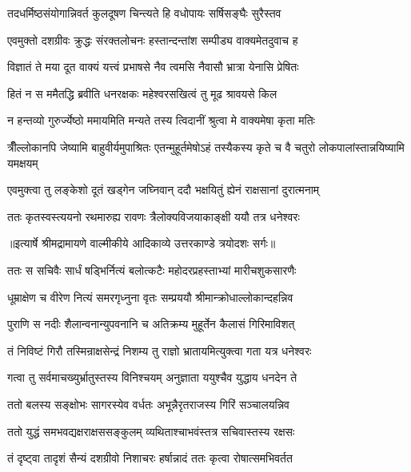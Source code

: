 \twolineshloka
{तदधर्मिष्ठसंयोगान्निवर्त कुलदूषण}
{चिन्त्यते हि वधोपायः सर्षिसङ्घैः सुरैस्तव} %

\twolineshloka
{एवमुक्तो दशग्रीवः क्रुद्धः संरक्तलोचनः}
{हस्तान्दन्तांश सम्पीड्य वाक्यमेतदुवाच ह} %

\twolineshloka
{विज्ञातं ते मया दूत वाक्यं यत्त्वं प्रभाषसे}
{नैव त्वमसि नैवासौ भ्रात्रा येनासि प्रेषितः} %

\twolineshloka
{हितं न स ममैतद्धि ब्रवीति धनरक्षकः}
{महेश्वरसखित्वं तु मूढ श्रावयसे किल} %

\twolineshloka
{न हन्तव्यो गुरुर्ज्येष्ठो ममायमिति मन्यते}
{तस्य त्विदानीं श्रुत्वा मे वाक्यमेषा कृता मतिः} %

\threelineshloka
{त्रीँल्लोकानपि जेष्यामि बाहुवीर्यमुपाश्रितः}
{एतन्मुहूर्तमेषोऽहं तस्यैकस्य कृते च वै}
{चतुरो लोकपालांस्तान्नयिष्यामि यमक्षयम्} %

\twolineshloka
{एवमुक्त्वा तु लङ्केशो दूतं खड्गेन जघ्निवान्}
{ददौ भक्षयितुं ह्येनं राक्षसानां दुरात्मनाम्} %

\twolineshloka
{ततः कृतस्वस्त्ययनो रथमारुह्य रावणः}
{त्रैलोक्यविजयाकाङ्क्षी ययौ तत्र धनेश्वरः} %


{॥इत्यार्षे श्रीमद्रामायणे वाल्मीकीये आदिकाव्ये उत्तरकाण्डे त्रयोदशः सर्गः॥}


\twolineshloka
{ततः स सचिवैः सार्धं षड्भिर्नित्यं बलोत्कटैः}
{महोदरप्रहस्ताभ्यां मारीचशुकसारणैः} %

\twolineshloka
{धूम्राक्षेण च वीरेण नित्यं समरगृध्नुना}
{वृतः सम्प्रययौ श्रीमान्क्रोधाल्लोकान्दहन्निव} %

\twolineshloka
{पुराणि स नदीः शैलान्वनान्युपवनानि च}
{अतिक्रम्य मुहूर्तेन कैलासं गिरिमाविशत्} %

\twolineshloka
{तं निविष्टं गिरौ तस्मिन्राक्षसेन्द्रं निशम्य तु}
{राज्ञो भ्रातायमित्युक्त्वा गता यत्र धनेश्वरः} %

\twolineshloka
{गत्वा तु सर्वमाचख्युर्भ्रातुस्तस्य विनिश्चयम्}
{अनुज्ञाता ययुश्चैव युद्धाय धनदेन ते} %

\twolineshloka
{ततो बलस्य सङ्क्षोभः सागरस्येव वर्धतः}
{अभून्नैरृतराजस्य गिरिं सञ्चालयन्निव} %

\twolineshloka
{ततो युद्धं समभवद्यक्षराक्षससङ्कुलम्}
{व्यथिताश्चाभवंस्तत्र सचिवास्तस्य रक्षसः} %

\twolineshloka
{तं दृष्ट्वा तादृशं सैन्यं दशग्रीवो निशाचरः}
{हर्षान्नादं ततः कृत्वा रोषात्समभिवर्तत} %


